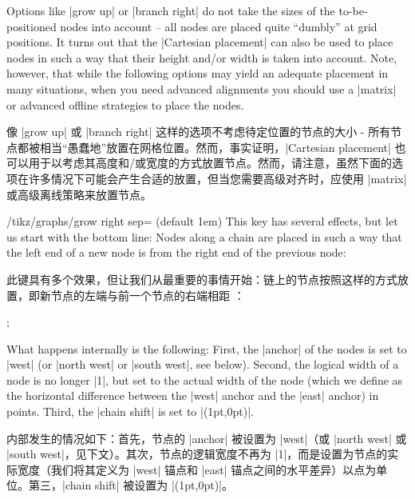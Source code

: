 Options like |grow up| or |branch right| do not take the sizes of the
to-be-positioned nodes into account -- all nodes are placed quite ``dumbly'' at
grid positions. It turns out that the |Cartesian placement| can also be used to
place nodes in such a way that their height and/or width is taken into account.
Note, however, that while the following options may yield an adequate placement
in many situations, when you need advanced alignments you should use a |matrix|
or advanced offline strategies to place the nodes.

像 |grow up| 或 |branch right| 这样的选项不考虑待定位置的节点的大小 - 所有节点都被相当“愚蠢地”放置在网格位置。然而，事实证明，|Cartesian placement| 也可以用于以考虑其高度和/或宽度的方式放置节点。然而，请注意，虽然下面的选项在许多情况下可能会产生合适的放置，但当您需要高级对齐时，应使用 |matrix| 或高级离线策略来放置节点。

\begin{key}{/tikz/graphs/grow right sep= (default 1em)}
    This key has several effects, but let us start with the bottom line: Nodes
    along a chain are placed in such a way that the left end of a new node is
     from the right end of the previous node:
    
    此键具有多个效果，但让我们从最重要的事情开始：链上的节点按照这样的方式放置，即新节点的左端与前一个节点的右端相距 ：

%
\begin{codeexample}[preamble={\usetikzlibrary{graphs}}]
\tikz {};
\end{codeexample}
    What happens internally is the following: First, the |anchor| of the nodes
    is set to |west| (or |north west| or |south west|, see below). Second, the
    logical width of a node is no longer |1|, but set to the actual width of
    the node (which we define as the horizontal difference between the |west|
    anchor and the |east| anchor) in points. Third, the |chain shift| is set to
    |(1pt,0pt)|.

    内部发生的情况如下：首先，节点的 |anchor| 被设置为 |west|（或 |north west| 或 |south west|，见下文）。其次，节点的逻辑宽度不再为 |1|，而是设置为节点的实际宽度（我们将其定义为 |west| 锚点和 |east| 锚点之间的水平差异）以点为单位。第三，|chain shift| 被设置为 |(1pt,0pt)|。

\end{key}

